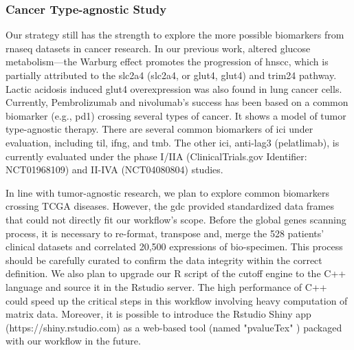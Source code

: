 \documentclass[jpm,article,submit,moreauthors,pdftex]{Definitions/mdpi}
\begin{document}
\begin{paracol}{2}
\subsubsection{Cancer Type-agnostic Study}
Our strategy still has the strength to explore the more possible biomarkers from \acrshort{rnaseq} datasets in cancer research.
In our previous work, altered glucose metabolism---the Warburg effect\cite{Warburg1956} promotes the progression of \acrshort{hnscc}, which is partially attributed to the \acrlong{slc2a4} (\acrshort{slc2a4}, or \acrlong{glut4}, \acrshort{glut4}) and \acrfull{trim24} pathway\cite{Chang2017b}\cite{Mani2020}.
Lactic acidosis induced \acrshort{glut4} overexpression was also found in lung cancer cells\cite{Prado-Garcia2020}. 
Currently, Pembrolizumab and nivolumab's success has been based on a common biomarker (e.g., \acrshort{pd1}) crossing several types of cancer.
It shows a model of tumor type-agnostic therapy\cite{Yan2018}.
There are several common biomarkers of \acrfull{ici} under evaluation, including \acrfull{til}, \acrfull{ifng}, and \acrfull{tmb}\cite{Gavrielatou2020}.
The other \acrshort{ici}, anti-\acrshort{lag3} (pelatlimab), is currently evaluated under the phase I/IIA\cite{Cristina2019} (ClinicalTrials.gov Identifier: NCT01968109) and II-IVA\cite{Neal2019} (NCT04080804) studies.

In line with tumor-agnostic research, we plan to explore common biomarkers crossing TCGA diseases. However, the \acrshort{gdc} provided standardized data frames that could not directly fit our workflow's scope. Before the global genes scanning process, it is necessary to re-format, transpose and, merge the 528 patients' clinical datasets and correlated 20,500 expressions of bio-specimen. This process should be carefully curated to confirm the data integrity within the correct definition\cite{Rendleman2019}. We also plan to upgrade our R script of the cutoff engine to the C++ language and source it in the Rstudio server. The high performance of C++ could speed up the critical steps in this workflow involving heavy computation of matrix data\cite{Woodward2020}. Moreover, it is possible to introduce the Rstudio Shiny app (https://shiny.rstudio.com) as a web-based tool (named "pvalueTex" ) packaged with our workflow in the future.



\end{paracol}
\end{document}
